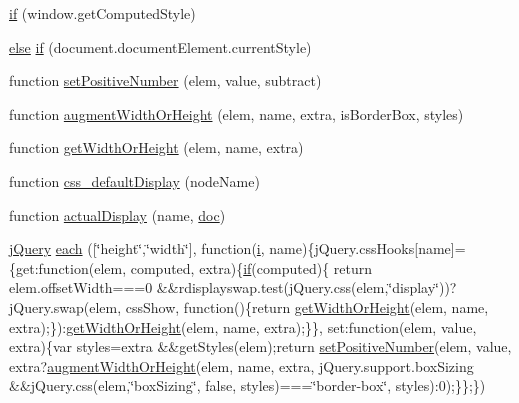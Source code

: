 \begin{DoxyCompactItemize}
\item 
\hyperlink{obj_2_release_2_package_2_package_tmp_2_scripts_2jquery-1_810_82_8js_add3620f254b483a46b557fde577ecbf7}{if} (window.\+get\+Computed\+Style)
\item 
\hyperlink{_scripts_2jquery_8validate_8js_a0544c3fe466e421738dae463968b70ba}{else} \hyperlink{obj_2_release_2_package_2_package_tmp_2_scripts_2jquery-1_810_82_8js_ac118b48e1947a1d7c85fefbdad49502e}{if} (document.\+document\+Element.\+current\+Style)
\item 
function \hyperlink{obj_2_release_2_package_2_package_tmp_2_scripts_2jquery-1_810_82_8js_a049182834e8b4b2d7485cd919ed272d7}{set\+Positive\+Number} (elem, value, subtract)
\item 
function \hyperlink{obj_2_release_2_package_2_package_tmp_2_scripts_2jquery-1_810_82_8js_aacaac1f0b5ea53030522e6f5b227ce51}{augment\+Width\+Or\+Height} (elem, name, extra, is\+Border\+Box, styles)
\item 
function \hyperlink{obj_2_release_2_package_2_package_tmp_2_scripts_2jquery-1_810_82_8js_a6520fbbeac78eeb0f519393470dc873b}{get\+Width\+Or\+Height} (elem, name, extra)
\item 
function \hyperlink{obj_2_release_2_package_2_package_tmp_2_scripts_2jquery-1_810_82_8js_a90f91be23732240774f2a323d500c78a}{css\+\_\+default\+Display} (node\+Name)
\item 
function \hyperlink{obj_2_release_2_package_2_package_tmp_2_scripts_2jquery-1_810_82_8js_a88bc5a80e40ccc594ece17ae5772d5d3}{actual\+Display} (name, \hyperlink{_scripts_2respond_8js_a8375eceb3a4b59a36700e7fc468e8983}{doc})
\item 
\hyperlink{_scripts_2jquery-1_810_82_8js_a41c2e1bff4a6b292938143764e31d789}{j\+Query} \hyperlink{obj_2_release_2_package_2_package_tmp_2_scripts_2jquery-1_810_82_8js_af7620627e2f905064d3dff5102ed804b}{each} (\mbox{[}\char`\"{}height\char`\"{},\char`\"{}width\char`\"{}\mbox{]}, function(\hyperlink{_scripts_2respond_8min_8js_a5e25b1d1bed9ab5f3174b76d6a722180}{i}, name)\{j\+Query.\+css\+Hooks\mbox{[}name\mbox{]}=\{get\+:function(elem, computed, extra)\{\hyperlink{_scripts_2respond_8min_8js_a93851d60dd037a83509a1757b9ee7b66}{if}(computed)\{   return elem.\+offset\+Width===0 \&\&rdisplayswap.\+test(j\+Query.\+css(elem,\char`\"{}display\char`\"{}))?j\+Query.\+swap(elem, css\+Show, function()\{return \hyperlink{_scripts_2jquery-1_810_82_8js_a6520fbbeac78eeb0f519393470dc873b}{get\+Width\+Or\+Height}(elem, name, extra);\})\+:\hyperlink{_scripts_2jquery-1_810_82_8js_a6520fbbeac78eeb0f519393470dc873b}{get\+Width\+Or\+Height}(elem, name, extra);\}\}, set\+:function(elem, value, extra)\{var styles=extra \&\&get\+Styles(elem);return \hyperlink{_scripts_2jquery-1_810_82_8js_a049182834e8b4b2d7485cd919ed272d7}{set\+Positive\+Number}(elem, value, extra?\hyperlink{_scripts_2jquery-1_810_82_8js_aacaac1f0b5ea53030522e6f5b227ce51}{augment\+Width\+Or\+Height}(elem, name, extra, j\+Query.\+support.\+box\+Sizing \&\&j\+Query.\+css(elem,\char`\"{}box\+Sizing\char`\"{}, false, styles)===\char`\"{}border-\/box\char`\"{}, styles)\+:0);\}\};\})

\end{DoxyCompactItemize}
